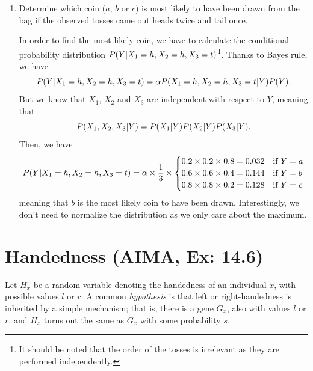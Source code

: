 \documentclass[11pt, a4paper]{article}
\begin{document}
\begin{enumerate}
    \item Determine which coin ($a$, $b$ or $c$) is most likely to have been drawn from the bag if the observed tosses came out heads twice and tail once.

    \begin{solution}
        In order to find the most likely coin, we have to calculate the conditional probability distribution $P(Y \vert X_1 = h, X_2 = h, X_3 = t)$\footnote{It should be noted that the order of the tosses is irrelevant as they are performed independently.}. Thanks to Bayes rule, we have
        \begin{equation*}
        P(Y \vert X_1 = h, X_2 = h, X_3 = t) = \alpha P(X_1 = h, X_2 = h, X_3 = t \vert Y) P(Y).
        \end{equation*}
        But we know that $X_1$, $X_2$ and $X_3$ are independent with respect to $Y$, meaning that
        \begin{equation*}
            P(X_1, X_2, X_3 \vert Y) = P(X_1 \vert Y) P(X_2 \vert Y) P(X_3 \vert Y).
        \end{equation*}
        Then, we have
        \begin{equation*}
            P(Y \vert X_1 = h, X_2 = h, X_3 = t) = \alpha \times \frac{1}{3} \times \begin{cases}
                0.2 \times 0.2 \times 0.8 = \num{0.032} & \text{if } Y = a \\
                0.6 \times 0.6 \times 0.4 = \num{0.144} & \text{if } Y = b \\
                0.8 \times 0.8 \times 0.2 = \num{0.128} & \text{if } Y = c \\
            \end{cases}
        \end{equation*}
        meaning that $b$ is the most likely coin to have been drawn. Interestingly, we don't need to normalize the distribution as we only care about the maximum.
    \end{solution}
\end{enumerate}

\newpage

\section{Handedness (AIMA, Ex: 14.6)}

Let $H_x$ be a random variable denoting the handedness of an individual $x$, with possible values $l$ or $r$. A common \emph{hypothesis} is that left or right-handedness is inherited by a simple mechanism; that is, there is a gene $G_x$, also with values $l$ or $r$, and $H_x$ turns out the same as $G_x$ with some probability $s$.
\end{document}
